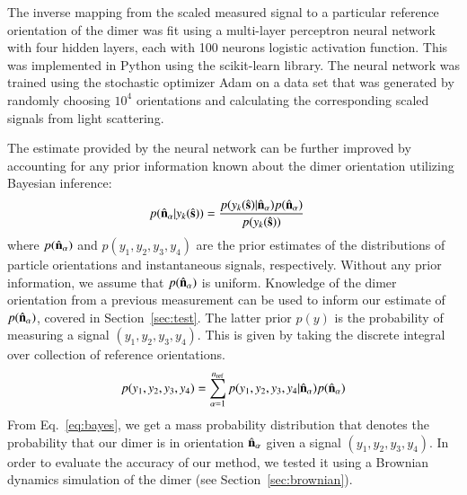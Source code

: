 \documentclass[final,  3p]{elsarticle}
\begin{document}


The inverse mapping from the scaled measured signal to a particular
reference orientation of the dimer was fit using a multi-layer
perceptron neural network with four hidden layers, each with 100
neurons logistic activation function.  This was implemented in Python
using the scikit-learn \cite{Pedregosa_etal_2011} library.
The neural network was trained using the stochastic optimizer Adam
\cite{Kingma_Ba_2014} on a data set that was generated by randomly
choosing $10^4$ orientations and calculating the corresponding scaled
signals from light scattering.
%
%


The estimate provided by the neural network can be further improved by
accounting for any prior information known about the dimer orientation
utilizing Bayesian inference:
\begin{align}
  \label{eq:bayes}
  p(\hat{\bf n}_\alpha| y_k(\hat{\bf s}))
  &=
    \frac{p(y_k(\hat{\bf s})|\hat{\bf n}_\alpha)
    p(\hat{\bf n}_\alpha)}{p(y_k(\hat{\bf s}))}
\end{align}
where $p(\hat{\bf n}_\alpha)$ and $p(y_1, y_2, y_3, y_4)$ are the
prior estimates of the distributions of particle orientations and
instantaneous signals, respectively.
%
Without any prior information, we assume that
$p(\hat{\bf n}_{\alpha})$ is uniform.  Knowledge of the dimer
orientation from a previous measurement can be used to inform our
estimate of $p(\hat{\bf n}_{\alpha})$, covered in
Section~\ref{sec:test}.  The latter prior $p(y)$ is the probability of
measuring a signal $(y_1, y_2, y_3, y_4)$.  This is given by taking
the discrete integral over collection of reference orientations.
\begin{align}
  p(y_1, y_2, y_3, y_4)
  =
  \sum_{\alpha=1}^{n_{\rm ref}}
  p(y_1, y_2, y_3, y_4|\hat{\bf n}_\alpha)
  p(\hat{\bf n}_\alpha)
\end{align}
From Eq.~\eqref{eq:bayes}, we get a mass probability distribution that
denotes the probability that our dimer is in orientation
$\hat{\bf n}_{\alpha}$ given a signal $(y_1, y_2, y_3, y_4)$.  In
order to evaluate the accuracy of our method, we tested it using a
Brownian dynamics simulation of the dimer (see
Section~\ref{sec:brownian}).
\end{document}
